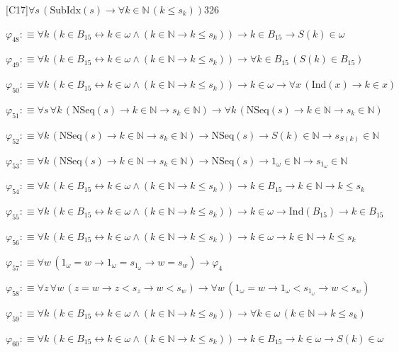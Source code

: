 \begin{fullproof}{[C17]}{$\forall s\,(\mathrm{SubIdx}(s) \to \forall k \in \mathbb{N}\,(k \leq s_{k}))$}{326}
\begin{abbrevlist}
\item $\varphi_{48} :\equiv \forall k\,(k \in B_{15} \leftrightarrow k \in \omega \land (k \in \mathbb{N} \to k \leq s_{k})) \to k \in B_{15} \to S(k) \in \omega$
\item $\varphi_{49} :\equiv \forall k\,(k \in B_{15} \leftrightarrow k \in \omega \land (k \in \mathbb{N} \to k \leq s_{k})) \to \forall k \in B_{15}\,(S(k) \in B_{15})$
\item $\varphi_{50} :\equiv \forall k\,(k \in B_{15} \leftrightarrow k \in \omega \land (k \in \mathbb{N} \to k \leq s_{k})) \to k \in \omega \to \forall x\,(\mathrm{Ind}(x) \to k \in x)$
\item $\varphi_{51} :\equiv \forall s\,\forall k\,(\mathrm{NSeq}(s) \to k \in \mathbb{N} \to s_{k} \in \mathbb{N}) \to \forall k\,(\mathrm{NSeq}(s) \to k \in \mathbb{N} \to s_{k} \in \mathbb{N})$
\item $\varphi_{52} :\equiv \forall k\,(\mathrm{NSeq}(s) \to k \in \mathbb{N} \to s_{k} \in \mathbb{N}) \to \mathrm{NSeq}(s) \to S(k) \in \mathbb{N} \to s_{S(k)} \in \mathbb{N}$
\item $\varphi_{53} :\equiv \forall k\,(\mathrm{NSeq}(s) \to k \in \mathbb{N} \to s_{k} \in \mathbb{N}) \to \mathrm{NSeq}(s) \to 1_{\omega} \in \mathbb{N} \to s_{1_{\omega}} \in \mathbb{N}$
\item $\varphi_{54} :\equiv \forall k\,(k \in B_{15} \leftrightarrow k \in \omega \land (k \in \mathbb{N} \to k \leq s_{k})) \to k \in B_{15} \to k \in \mathbb{N} \to k \leq s_{k}$
\item $\varphi_{55} :\equiv \forall k\,(k \in B_{15} \leftrightarrow k \in \omega \land (k \in \mathbb{N} \to k \leq s_{k})) \to k \in \omega \to \mathrm{Ind}(B_{15}) \to k \in B_{15}$
\item $\varphi_{56} :\equiv \forall k\,(k \in B_{15} \leftrightarrow k \in \omega \land (k \in \mathbb{N} \to k \leq s_{k})) \to k \in \omega \to k \in \mathbb{N} \to k \leq s_{k}$
\item $\varphi_{57} :\equiv \forall w\,(1_{\omega} = w \to 1_{\omega} = s_{1_{\omega}} \to w = s_{w}) \to \varphi_{4}$
\item $\varphi_{58} :\equiv \forall z\,\forall w\,(z = w \to z < s_{z} \to w < s_{w}) \to \forall w\,(1_{\omega} = w \to 1_{\omega} < s_{1_{\omega}} \to w < s_{w})$
\item $\varphi_{59} :\equiv \forall k\,(k \in B_{15} \leftrightarrow k \in \omega \land (k \in \mathbb{N} \to k \leq s_{k})) \to \forall k \in \omega\,(k \in \mathbb{N} \to k \leq s_{k})$
\item $\varphi_{60} :\equiv \forall k\,(k \in B_{15} \leftrightarrow k \in \omega \land (k \in \mathbb{N} \to k \leq s_{k})) \to k \in B_{15} \to k \in \omega \to S(k) \in \omega$

\end{abbrevlist}
\end{fullproof}
